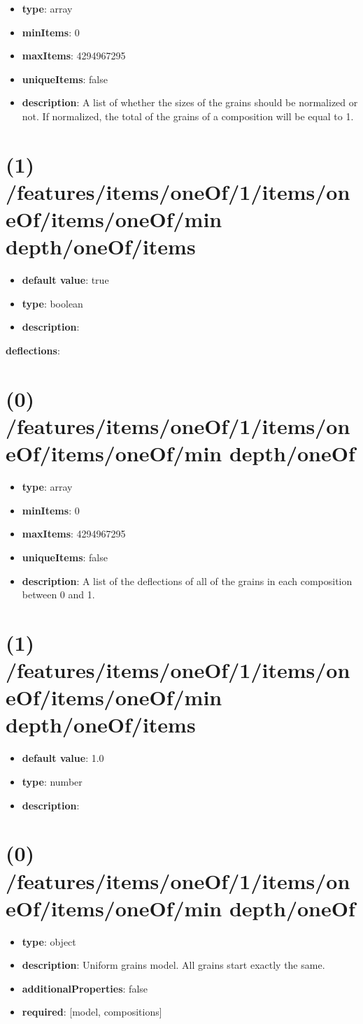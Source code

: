 \begin{itemize}[leftmargin=0em]\item {\bf type}: array
\item {\bf minItems}: 0
\item {\bf maxItems}: 4294967295
\item {\bf uniqueItems}: false
\item {\bf description}: A list of whether the sizes of the grains should be normalized or not. If normalized, the total of the grains of a composition will be equal to 1.
\end{itemize}\section{(1) /features/items/oneOf/1/items/oneOf/items/oneOf/min depth/oneOf/items}
\begin{itemize}[leftmargin=1em]\item {\bf default value}: true
\item {\bf type}: boolean
\item {\bf description}: 
\end{itemize}\item {\bf deflections}: \section{(0) /features/items/oneOf/1/items/oneOf/items/oneOf/min depth/oneOf}
\begin{itemize}[leftmargin=0em]\item {\bf type}: array
\item {\bf minItems}: 0
\item {\bf maxItems}: 4294967295
\item {\bf uniqueItems}: false
\item {\bf description}: A list of the deflections of all of the grains in each composition between 0 and 1.
\end{itemize}\section{(1) /features/items/oneOf/1/items/oneOf/items/oneOf/min depth/oneOf/items}
\begin{itemize}[leftmargin=1em]\item {\bf default value}: 1.0
\item {\bf type}: number
\item {\bf description}: 
\end{itemize}\section{(0) /features/items/oneOf/1/items/oneOf/items/oneOf/min depth/oneOf}
\begin{itemize}[leftmargin=0em]\item {\bf type}: object
\item {\bf description}: Uniform grains model. All grains start exactly the same.
\item {\bf additionalProperties}: false
\item {\bf required}: [model, compositions]\end{itemize}
